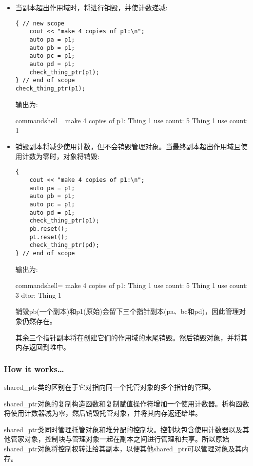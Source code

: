 \begin{itemize}
\item 
当副本超出作用域时，将进行销毁，并使计数递减:

\begin{lstlisting}[style=styleCXX]
{ // new scope
	cout << "make 4 copies of p1:\n";
	auto pa = p1;
	auto pb = p1;
	auto pc = p1;
	auto pd = p1;
	check_thing_ptr(p1);
} // end of scope
check_thing_ptr(p1);
\end{lstlisting}

输出为:

\begin{tcblisting}{commandshell={}}
make 4 copies of p1:
Thing 1 use count: 5
Thing 1 use count: 1
\end{tcblisting}

\item 
销毁副本将减少使用计数，但不会销毁管理对象。当最终副本超出作用域且使用计数为零时，对象将销毁:

\begin{lstlisting}[style=styleCXX]
{
	cout << "make 4 copies of p1:\n";
	auto pa = p1;
	auto pb = p1;
	auto pc = p1;
	auto pd = p1;
	check_thing_ptr(p1);
	pb.reset();
	p1.reset();
	check_thing_ptr(pd);
} // end of scope
\end{lstlisting}

输出为:

\begin{tcblisting}{commandshell={}}
make 4 copies of p1:
Thing 1 use count: 5
Thing 1 use count: 3
dtor: Thing 1
\end{tcblisting}

销毁pb(一个副本)和p1(原始)会留下三个指针副本(pa、bc和pd)，因此管理对象仍然存在。

其余三个指针副本将在创建它们的作用域的末尾销毁。然后销毁对象，并将其内存返回到堆中。

\end{itemize}

\subsubsection{How it works…}

shared\_ptr类的区别在于它对指向同一个托管对象的多个指针的管理。

shared\_ptr对象的复制构造函数和复制赋值操作符增加一个使用计数器。析构函数将使用计数器减为零，然后销毁托管对象，并将其内存返还给堆。

shared\_ptr类同时管理托管对象和堆分配的控制块。控制块包含使用计数器以及其他管家对象，控制块与管理对象一起在副本之间进行管理和共享。所以原始shared\_ptr对象将控制权转让给其副本，以便其他shared\_ptr可以管理对象及其内存。





























